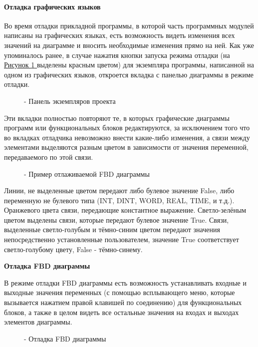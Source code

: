 \documentclass[letterpaper,10pt,russian]{sphinxmanual}
\begin{document}
\paragraph{Отладка графических языков}
\label{usage_guide/work_with_project:id20}
Во время отладки прикладной программы, в которой часть программных
модулей написаны на графических языках, есть возможность видеть
изменения всех значений на диаграмме и вносить необходимые изменения
прямо на ней. Как уже упоминалось ранее, в случае нажатия
кнопки запуска режима отладки (на \hyperref[usage_guide/work_with_project:image220]{Рисунок \ref{usage_guide/work_with_project:image220} } выделены красным цветом) для
экземпляра программы, написанной на одном из графических языков,
откроется вкладка с панелью диаграммы в режиме отладки.
\begin{figure}[htbp]
\centering
\capstart

\noindent{}
\caption{- Панель экземпляров проекта}\label{usage_guide/work_with_project:image220}\end{figure}

Эти вкладки полностью повторяют те, в которых графические диаграммы
программ или функциональных блоков редактируются, за исключением того
что во вкладках отладчика невозможно внести какие-либо изменения, а
связи между элементами выделяются разным цветом в зависимости от
значения переменной, передаваемого по этой связи.
\begin{figure}[htbp]
\centering
\capstart

\noindent{}
\caption{- Пример отлаживаемой FBD диаграммы}\label{usage_guide/work_with_project:image221}\end{figure}

Линии, не выделенные цветом передают либо булевое значение False, либо
переменную не булевого типа (INT, DINT, WORD, REAL, TIME, и т.д.).
Оранжевого цвета связи, передающие константное выражение. Светло-зелёным
цветом выделены связи, которые передают булевое значение True. Связи,
выделенные светло-голубым и тёмно-синим цветом передают значения
непосредственно установленные пользователем, значение
True соответствует светло-голубому цвету, False - тёмно-синему.

\textbf{Отладка FBD диаграммы}

В режиме отладки FBD диаграммы есть возможность устанавливать входные и
выходные значения переменных (с помощью всплывающего меню, которые
вызывается нажатием правой клавишей по соединению) для функциональных
блоков, а также в целом видеть все остальные значения на входах и
выходах элементов диаграммы.
\begin{figure}[htbp]
\centering
\capstart

\noindent{}
\caption{- Отладка FBD диаграммы}\label{usage_guide/work_with_project:image222}\end{figure}
\end{document}
